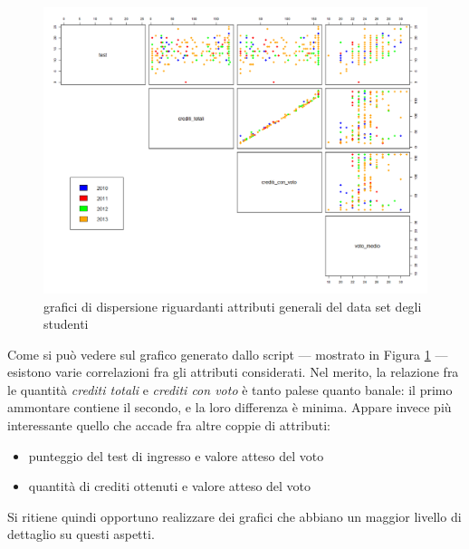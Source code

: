             \begin{figure}
                \caption{grafici di dispersione riguardanti attributi generali del data set degli studenti}
                \label{fig1}
            	\includegraphics[scale=0.33]{img/scatter_plot_1_gen.png}
            \end{figure}

            Come si può vedere sul grafico generato dallo script --- mostrato in Figura \ref{fig1} --- esistono varie correlazioni fra gli attributi considerati. Nel merito, la relazione fra le quantità \textit{crediti totali} e \textit{crediti con voto} è tanto palese quanto banale: il primo ammontare contiene il secondo, e la loro differenza è minima. Appare invece più interessante quello che accade fra altre coppie di attributi:

            \begin{itemize}
                \item punteggio del test di ingresso e valore atteso del voto
                \item quantità di crediti ottenuti e valore atteso del voto
            \end{itemize}

            Si ritiene quindi opportuno realizzare dei grafici che abbiano un maggior livello di dettaglio su questi aspetti. \\

